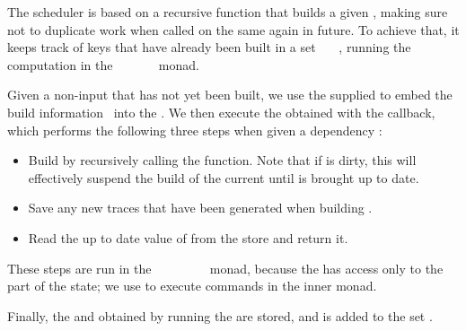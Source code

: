 The  scheduler is based on a recursive function  that
builds a given , making sure not to duplicate work when called on the
same  again in future. To achieve that, it keeps track of keys that have
already been built in a set ~\hs{::}~~, running the
computation in the
~~~~~~ monad.

Given a non-input  that has not yet been built, we use the supplied
 to embed the build information~ into the .
We then execute the obtained  with the  callback, which
performs the following three steps when given a dependency :

\begin{itemize}
    \item Build  by recursively calling the  function. Note
          that if  is dirty, this will effectively suspend the build of
          the current  until  is brought up to date.
    \item Save any new traces that have been generated when building .
    \item Read the up to date value of  from the store and return it.
\end{itemize}

These steps are run in the
~~~~~~~~
monad, because the  has access only to the~ part of the state;
we use  to execute commands in the inner monad.

Finally, the  and  obtained by running the 
are stored, and  is added to the set .

\vspace{-2mm}
\subsection{\Bazel}\label{sec-implementation-bazel}
\vspace{-1mm}

